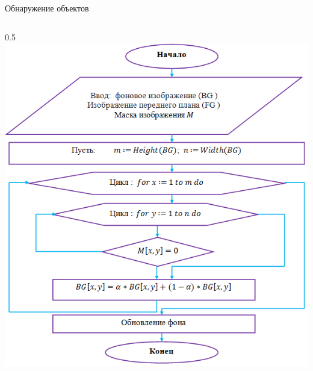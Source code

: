 \documentclass[10pt,pdf,hyperref={unicode},xcolor=table]{beamer}
\begin{document}
\begin{frame}{Обнаружение объектов}
\begin{columns}
\begin{column} {0.5\textwidth}
						\includegraphics[width=1\linewidth]{p4}
			\end{column}      
		\end{columns}
\end{frame}
\end{document}
